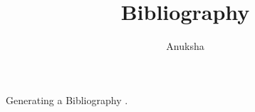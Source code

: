 \documentclass[12pt]{article}
\begin{document}
\title{Bibliography}
\author{Anuksha}
\maketitle
Generating a Bibliography  \cite{ulversoy2010software}.



\end{document}
